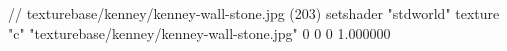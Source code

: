 // texturebase/kenney/kenney-wall-stone.jpg (203)
setshader "stdworld"
texture "c" "texturebase/kenney/kenney-wall-stone.jpg" 0 0 0 1.000000
